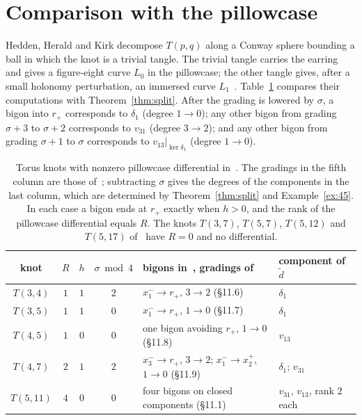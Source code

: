 \documentclass[11pt,reqno]{amsart}
\theoremstyle{plain}
\theoremstyle{definition}
\newcommand{\td}{\widetilde d}
\begin{document}
\section{Comparison with the pillowcase}\label{sec:pillow}

Hedden, Herald and Kirk decompose $T(p,q)$ along a Conway sphere bounding a ball in which the knot is a
trivial tangle. The trivial tangle carries the earring and gives a figure-eight curve $L_0$ in the
pillowcase; the other tangle gives, after a small holonomy perturbation, an immersed curve
$L_1$~\cite[\S\S10--11]{HHK2}. Table~\ref{tab:pillow} compares their computations with
Theorem~\ref{thm:split}. After the grading is lowered by $\sigma$, a bigon into $r_+$ corresponds to
$\delta_1$ (degree $1\to0$); any other bigon from grading $\sigma+3$ to $\sigma+2$ corresponds to $v_{31}$
(degree $3\to2$); and any other bigon from grading $\sigma+1$ to $\sigma$ corresponds to
$v_{13}|_{\ker\delta_1}$ (degree $1\to0$).

\begin{table}[ht]
\centering\small
\begin{tabular}{c|c|c|c|l|l}
knot & $R$ & $h$ & $\sigma\bmod4$ & bigons in~\cite{HHK2}, gradings of~\cite{HHK2} & component of $\td$\\ \hline
$T(3,4)$ & $1$ & $1$ & $2$ & $x_1^-\to r_+$, $3\to2$ (\S11.6) & $\delta_1$\\
$T(3,5)$ & $1$ & $1$ & $0$ & $x_1^-\to r_+$, $1\to0$ (\S11.7) & $\delta_1$\\
$T(4,5)$ & $1$ & $0$ & $0$ & one bigon avoiding $r_+$, $1\to0$ (\S11.8) & $v_{13}$\\
$T(4,7)$ & $2$ & $1$ & $2$ & $x_3^-\to r_+$, $3\to2$; $x_1^-\to x_2^+$, $1\to0$ (\S11.9) & $\delta_1$; $v_{31}$\\
$T(5,11)$ & $4$ & $0$ & $0$ & four bigons on closed components (\S11.1) & $v_{31}$, $v_{13}$, rank $2$ each\\
\end{tabular}
\medskip
\caption{Torus knots with nonzero pillowcase differential in~\cite{HHK2}. The gradings in the fifth column
are those of~\cite{HHK2}; subtracting $\sigma$ gives the degrees of the components in the last column,
which are determined by Theorem~\ref{thm:split} and Example~\ref{ex:45}. In each case a bigon ends at
$r_+$ exactly when $h>0$, and the rank of the pillowcase differential equals $R$. The knots $T(3,7)$,
$T(5,7)$, $T(5,12)$ and $T(5,17)$ of~\cite[\S11]{HHK2} have $R=0$ and no differential.}
\label{tab:pillow}
\end{table}
\end{document}
